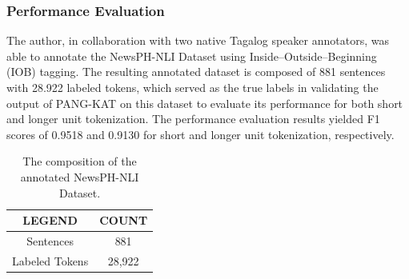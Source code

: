 \documentclass[journal]{./IEEE/IEEEtran}
\begin{document}
\begin{table}[H]
    \centering %
    \captionsetup{justification=centering}
    \caption{Unit testing results for PANG-KAT’s longer-unit tokenization.}  \label{tab:effects}
    \vspace{1mm} %
    \renewcommand{\arraystretch}{1.5}
    \fontsize{102pt}{200pt}\selectfont
\end{table}

\subsubsection{Performance Evaluation}

 The author, in collaboration with two native Tagalog speaker annotators, was able to annotate the NewsPH-NLI Dataset using Inside–Outside–Beginning (IOB) tagging. The resulting annotated dataset is composed of 881 sentences with 28.922 labeled tokens, which served as the true labels in validating the output of PANG-KAT on this dataset to evaluate its performance for both short and longer unit tokenization. The performance evaluation results yielded F1 scores of 0.9518 and 0.9130 for short and longer unit tokenization, respectively. \\

\begin{table}[H]
    \centering %
    \captionsetup{justification=centering}
    \caption{The composition of the annotated NewsPH-NLI Dataset.}  \label{tab:effects}
    \vspace{1mm} %
    \renewcommand{\arraystretch}{1.5}
    \fontsize{11pt}{11pt}\selectfont

    \begin{tabular}{|c|c|}
    \hline
    \textbf{LEGEND} & \textbf{COUNT} \\ \hline
    Sentences       & 881            \\ \hline
    Labeled Tokens  & 28,922         \\ \hline
    \end{tabular}
\end{table}
\end{document}

